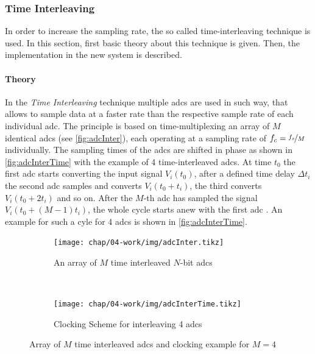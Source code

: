 \subsubsection{Time Interleaving}\label{sssec:time-interleaving}
In order to increase the sampling rate, the so called time-interleaving technique is used. In this section, first basic theory about this technique is given. Then, the implementation in the new system is described.

\paragraph{Theory}
In the \textit{Time Interleaving} technique multiple \glspl{adc} are used in such way, that allows to sample data at a faster rate than the respective sample rate of each individual \gls{adc}. 
The principle is based on time-multiplexing an array of $M$ identical \glspl{adc} (see \autoref{fig:adcInter}), each operating at a sampling rate of $f_c = \nicefrac{f_s}{M}$ individually. 
The sampling times of the \glspl{adc} are shifted in phase as shown in \autoref{fig:adcInterTime} with the example of 4 time-interleaved \glspl{adc}.  
At time $t_0$ the first \gls{adc} starts converting the input signal $V_i(t_0)$, after a defined time delay $\Delta t_i$ the second \gls{adc} samples and converts $V_i(t_0 + t_i)$, the third converts $V_i(t_0 + 2t_i)$ and so on. 
After the $M$-th \gls{adc} has sampled the signal $V_i(t_0 + (M-1)t_i)$, the whole cycle starts anew with the first \gls{adc} \cite{mangrob}.
An example for such a cyle for 4 \glspl{adc} is shown in \autoref{fig:adcInterTime}.

\begin{figure}[tbh]
	\centering
	\begin{subfigure}{\textwidth}
		\centering
		\texttt{[image: chap/04-work/img/adcInter.tikz]}  
		\caption{An array of $M$ time interleaved $N$-bit \glspl{adc} \cite{mangrob}}
		\label{fig:adcInter}
	\end{subfigure}
	\\[3ex]
	\begin{subfigure}{\textwidth}
		\centering
		\tikzexternaldisable
		\texttt{[image: chap/04-work/img/adcInterTime.tikz]}  
		\caption{Clocking Scheme for interleaving 4 \glspl{adc}}
		\tikzexternalenable
		\label{fig:adcInterTime}
	\end{subfigure}
	\caption[Time-Interleaving Method]{Array of $M$ time interleaved \glspl{adc} and clocking example for $M = 4$}
	\label{fig:interleaving}
\end{figure}

